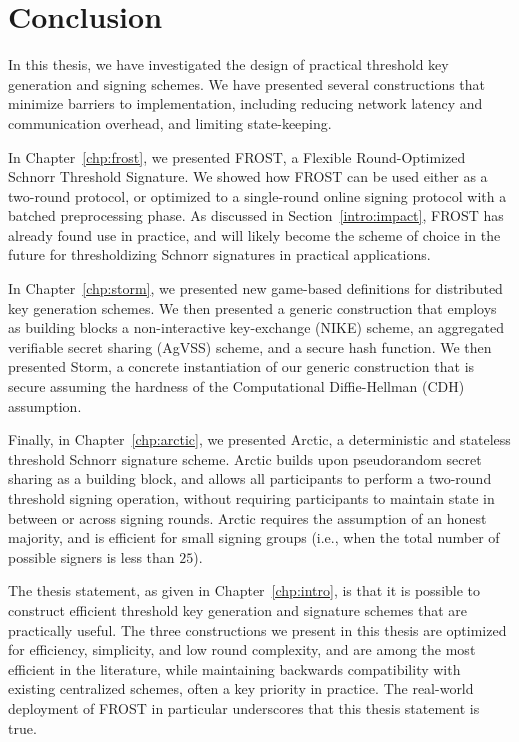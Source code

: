 \chapter{Conclusion}

In this thesis,
we have investigated the design of practical threshold key generation and signing schemes.
We have presented several constructions that minimize barriers to implementation,
including reducing network latency and communication overhead,
and limiting state-keeping.

In Chapter~\ref{chp:frost},
we presented FROST,
a Flexible Round-Optimized Schnorr Threshold Signature.
We showed how FROST can be used either as a two-round protocol,
or optimized to a single-round online signing protocol with a batched preprocessing phase.
As discussed in
Section~\ref{intro:impact},
FROST has already found use in practice,
and will likely become the scheme of choice in the future for thresholdizing Schnorr signatures in practical applications.

In Chapter~\ref{chp:storm},
we presented new game-based definitions for distributed key generation schemes.
We then presented a generic construction that employs as building blocks a non-interactive key-exchange (NIKE) scheme,
an aggregated verifiable secret sharing (AgVSS) scheme,
and a secure hash function.
We then presented Storm,
a concrete instantiation of our generic construction that is secure assuming the hardness of the Computational Diffie-Hellman (CDH) assumption.

Finally, in Chapter~\ref{chp:arctic},
we presented Arctic,
a deterministic and stateless threshold Schnorr signature scheme.
Arctic builds upon pseudorandom secret sharing as a building block,
and allows all participants to perform a two-round threshold signing operation,
without requiring participants to maintain state in between or across signing
rounds.
Arctic requires the assumption of an honest majority,
and is efficient for small signing groups (i.e., when the total number of
possible signers is less than $25$).

The thesis statement,
as given in Chapter~\ref{chp:intro},
is that it is possible to construct efficient threshold key generation and signature schemes that are practically useful.
The three constructions we present in this thesis are optimized for efficiency,
simplicity,
and low round complexity,
and are among the most efficient in the literature,
while maintaining backwards compatibility with existing centralized schemes,
often a key priority in practice.
The real-world deployment of FROST in particular underscores that this thesis statement is true.

